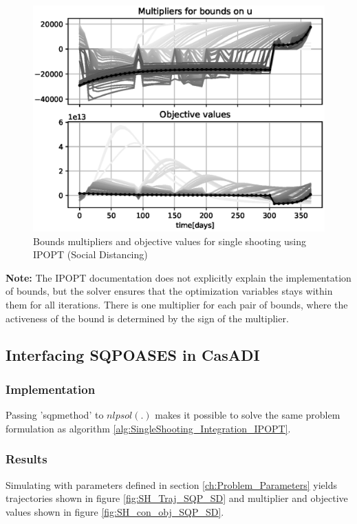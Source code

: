 \begin{figure}[H]
    \centering
    \includegraphics[width=.8\textwidth]{pythonProject/Figures/Single_Shooting_obj_con_IPOPT_Social_Distancing.eps}
    \caption{Bounds multipliers and objective values for single shooting using IPOPT (Social Distancing)}
    \label{fig:SH_con_obj_IPOPT_SD}
\end{figure}


\textbf{Note:} The IPOPT documentation does not explicitly explain the implementation of bounds, but the solver ensures that the optimization variables stays within them for all iterations. There is one multiplier for each pair of bounds, where the activeness of the bound is determined by the sign of the multiplier.

\subsection{Interfacing SQPOASES in CasADI}
\subsubsection{Implementation}
Passing 'sqpmethod' to $nlpsol(.)$ makes it possible to solve the same problem formulation as algorithm \ref{alg:SingleShooting_Integration_IPOPT}.

\subsubsection{Results}
Simulating with parameters defined in section \ref{ch:Problem_Parameters} yields trajectories shown in figure \ref{fig:SH_Traj_SQP_SD} and multiplier and objective values shown in figure \ref{fig:SH_con_obj_SQP_SD}.


